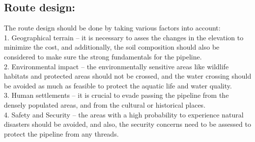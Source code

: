 \documentclass[12pt]{article}
\begin{document}
      \subsection{Route design: }
      {\fontsize{12pt}{12pt}

      The route design should be done by taking various factors into account: \\
      \hspace*{1em}1.	Geographical terrain – it is necessary to asses the changes in the elevation to minimize the cost, and additionally, the soil composition should also be considered to make sure the strong fundamentals for the pipeline. \\
      \hspace*{1em}2.	Environmental impact – the environmentally sensitive areas like wildlife habitats and protected areas should not be crossed, and the water crossing should be avoided as much as feasible to protect the aquatic life and water quality. \\
      \hspace*{1em}3.	Human settlements – it is crucial to evade passing the pipeline from the densely populated areas, and from the cultural or historical places. \\
      \hspace*{1em}4. Safety and Security – the areas with a high probability to experience natural disasters should be avoided, and also, the security concerns need to be assessed to protect the pipeline from any threads.  \\

      }
\end{document}
